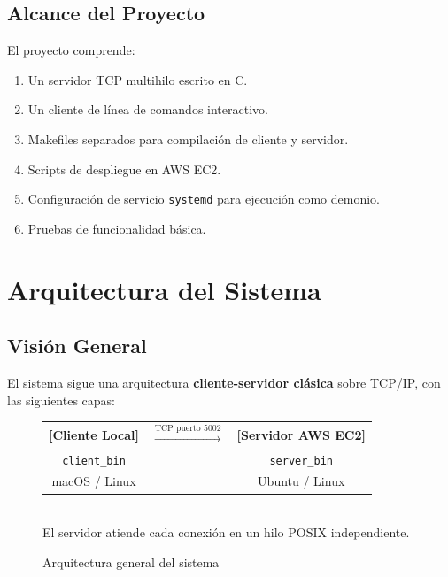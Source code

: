 \documentclass[12pt,a4paper]{report}
\begin{document}
\section{Alcance del Proyecto}

El proyecto comprende:

\begin{enumerate}[leftmargin=1.5em]
  \item Un servidor TCP multihilo escrito en C.
  \item Un cliente de línea de comandos interactivo.
  \item Makefiles separados para compilación de cliente y servidor.
  \item Scripts de despliegue en AWS EC2.
  \item Configuración de servicio \texttt{systemd} para ejecución como demonio.
  \item Pruebas de funcionalidad básica.
\end{enumerate}

\chapter{Arquitectura del Sistema}

\section{Visión General}

El sistema sigue una arquitectura \textbf{cliente-servidor clásica} sobre TCP/IP, con las siguientes capas:

\begin{figure}[H]
  \centering
  \begin{tcolorbox}[colback=grisClaro, colframe=azulTitulo, width=0.85\textwidth,
                    title=\textbf{Diagrama de Arquitectura}]
    \centering
    \ttfamily\small
    \begin{tabular}{ccc}
      \textbf{[Cliente Local]} & $\xrightarrow{\text{TCP puerto 5002}}$ & \textbf{[Servidor AWS EC2]} \\
      \texttt{client\_bin}     &                                         & \texttt{server\_bin}        \\
      macOS / Linux            &                                         & Ubuntu / Linux              \\
    \end{tabular}\\[1em]
    \normalfont\small
    El servidor atiende cada conexión en un hilo POSIX independiente.
  \end{tcolorbox}
  \caption{Arquitectura general del sistema}
\end{figure}
\end{document}
